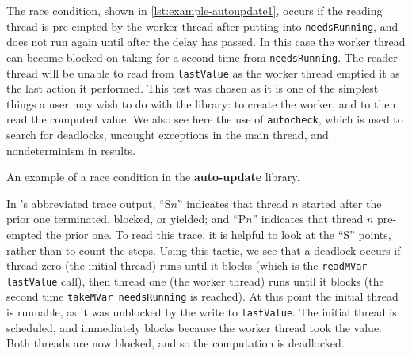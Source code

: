 The race condition, shown in \cref{lst:example-autoupdate1}, occurs if
the reading thread is pre-empted by the worker thread after putting
into \verb|needsRunning|, and does not run again until after the delay
has passed.  In this case the worker thread can become blocked on
taking for a second time from \verb|needsRunning|.  The reader thread
will be unable to read from \verb|lastValue| as the worker thread
emptied it as the last action it performed.  This test was chosen as
it is one of the simplest things a user may wish to do with the
library: to create the worker, and to then read the computed value.
We also see here the use of \verb|autocheck|, which is used to search
for deadlocks, uncaught exceptions in the main thread, and
nondeterminism in results.

\FloatBarrier

\begin{listing}
\centering
{}
\caption{An example of a race condition in the \textbf{auto-update} library.}\label{lst:example-autoupdate1}
\end{listing}

In \dejafu{}'s abbreviated trace output, ``S$n$'' indicates that
thread $n$ started after the prior one terminated, blocked, or
yielded; and ``P$n$'' indicates that thread $n$ pre-empted the prior
one.  To read this trace, it is helpful to look at the ``S'' points,
rather than to count the steps.  Using this tactic, we see that a
deadlock occurs if thread zero (the initial thread) runs until it
blocks (which is the \verb|readMVar lastValue| call), then thread one
(the worker thread) runs until it blocks (the second time
\verb|takeMVar needsRunning| is reached).  At this point the initial
thread is runnable, as it was unblocked by the write to
\verb|lastValue|.  The initial thread is scheduled, and immediately
blocks because the worker thread took the value.  Both threads are now
blocked, and so the computation is deadlocked.

